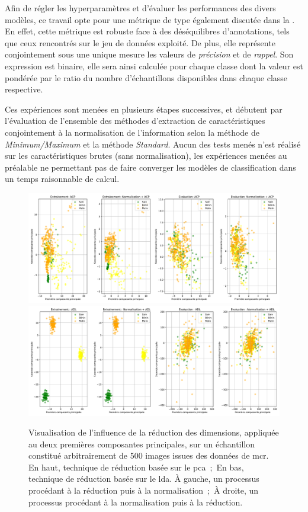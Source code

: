Afin de régler les hyperparamètres et d'évaluer les performances des divers modèles, ce travail opte pour une métrique de type \fscore{} également discutée dans la . En effet, cette métrique est robuste face à des déséquilibres d'annotations, tels que ceux rencontrés sur le jeu de données exploité. De plus, elle représente conjointement sous une unique mesure les valeurs de \textit{précision} et de \textit{rappel}. Son expression est binaire, elle sera ainsi calculée pour chaque classe dont la valeur est pondérée par le ratio du nombre d'échantillons disponibles dans chaque classe respective.\par

Ces expériences sont menées en plusieurs étapes successives, et débutent par l'évaluation de l'ensemble des méthodes d'extraction de caractéristiques conjointement à la normalisation de l'information selon la méthode de \textit{Minimum/Maximum} et la méthode \textit{Standard}. Aucun des tests menés n'est réalisé sur les caractéristiques brutes (sans normalisation), les expériences menées au préalable ne permettant pas de faire converger les modèles de classification dans un temps raisonnable de calcul.\par
 
\begin{figure}[H]
    \centering
    \includegraphics[width=\linewidth]{contents/chapter_5/resources/visualisation_scaling_PCA.pdf}
    \includegraphics[width=\linewidth]{contents/chapter_5/resources/visualisation_scaling_LDA.pdf}
    \caption{Visualisation de l'influence de la réduction des dimensions, appliquée au deux premières composantes principales, sur un échantillon constitué arbitrairement de 500 images issues des données de \gls{mcr}. En haut, technique de réduction basée sur le \gls{pca}~;~En bas, technique de réduction basée sur le \gls{lda}. À gauche, un processus procédant à la réduction puis à la normalisation~;~À droite, un processus procédant à la normalisation puis à la réduction.}
    \label{fig:visualisation_scaling_reduction}
\end{figure}\par


